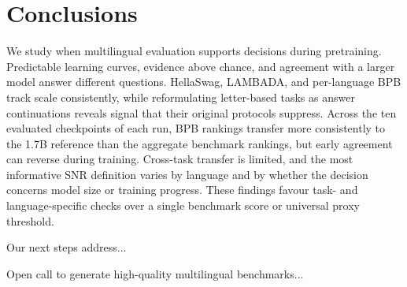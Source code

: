 \section{Conclusions}
\label{sec:conclusions}

We study when multilingual evaluation supports decisions during pretraining. Predictable learning curves, evidence above chance, and agreement with a larger model answer different questions. HellaSwag, LAMBADA, and per-language BPB track scale consistently, while reformulating letter-based tasks as answer continuations reveals signal that their original protocols suppress. Across the ten evaluated checkpoints of each run, BPB rankings transfer more consistently to the 1.7B reference than the aggregate benchmark rankings, but early agreement can reverse during training. Cross-task transfer is limited, and the most informative SNR definition varies by language and by whether the decision concerns model size or training progress. These findings favour task- and language-specific checks over a single benchmark score or universal proxy threshold.


Our next steps address...

Open call to generate high-quality multilingual benchmarks...


